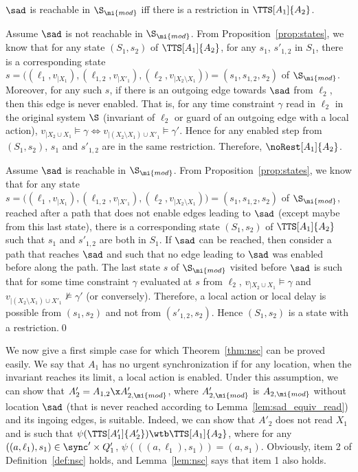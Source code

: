 \documentclass{LMCS}
\theoremstyle{plain}\newtheorem*{prop11}{Proposition~\ref{prop:states} bis}
\begin{document}
\begin{lem}\label{lem:sad_equiv_read}
  $\sad$ is reachable in $\S_\mi{mod}$ iff there is a restriction
  in $\TTS[A_1]{A_2}$.
\end{lem}
\proof
  Assume $\sad$ is not reachable in $\S_\mi{mod}$. From
  Proposition~\ref{prop:states}, we know that for any state $(S_1,s_2)$ of
  $\TTS[A_1]{A_2}$, for any $s_1$, $s'_{1,2}$ in $S_1$, there is a
  corresponding state $s=\big((\ell_1,v_{|X_1}),(\ell_{1,2},v_{|X'_1}),
  (\ell_2,v_{|X_2\setminus X_1})\big)=(s_1,s_{1,2},s_2)$ of $\S_\mi{mod}$. Moreover, for
  any such $s$, if there is an outgoing edge towards $\sad$ from $\ell_2$,
  then this edge is never enabled. That is, for any time constraint $\gamma$
  read in $\ell_2$ in the original system $\S$ (invariant of $\ell_2$ or
  guard of an outgoing edge with a local action),
  $v_{|X_2\cup X_1}\models \gamma\iff
  v_{|(X_2\setminus X_1)\cup X'_1}\models \gamma'$.
  Hence for any enabled step from $(S_1,s_2)$, $s_1$ and $s'_{1,2}$ are in the
  same restriction. Therefore, $\noRest[A_1]{A_2}$.

  Assume $\sad$ is reachable in $\S_\mi{mod}$. From
  Proposition~\ref{prop:states}, we know that for any state
  $s=\big((\ell_1,v_{|X_1}),(\ell_{1,2},v_{|X'_1}),(\ell_2,v_{|X_2\setminus X_1})\big)
  =(s_1,s_{1,2},s_2)$ of $\S_\mi{mod}$, reached after a path that does not
  enable edges leading to $\sad$ (except maybe from this last state), there
  is a corresponding state $(S_1,s_2)$ of $\TTS[A_1]{A_2}$ such that
  $s_1$ and $s'_{1,2}$ are both in $S_1$.
If $\sad$ can be reached, then consider a path that reaches $\sad$
  and such that no edge leading to $\sad$ was enabled before along the path.
  The last state $s$ of $\S_\mi{mod}$ visited before $\sad$ is such that
  for some time constraint $\gamma$ evaluated at $s$ from $\ell_2$,
  $v_{|X_2\cup X_1}\models \gamma$ and
  $v_{|(X_2\setminus X_1)\cup X'_1}\not\models \gamma'$ (or conversely).
  Therefore, a local action or local delay is possible from $(s_1,s_2)$ and
  not from $(s'_{1,2},s_2)$.
  Hence $(S_1,s_2)$ is a state with a restriction.\qed




We now give a first simple case for which Theorem~\ref{thm:nsc} can be proved
easily. We say that $A_1$ has no urgent synchronization if for any location,
when the invariant reaches its limit, a local action is enabled.
Under this assumption, we can show that
$A'_2=A_{1,2}\x A'_{2,\mi{mod}}$, where $A'_{2,\mi{mod}}$ is
$A_{2,\mi{mod}}$ without location $\sad$ (that is never reached according to
Lemma~\ref{lem:sad_equiv_read}) and its ingoing edges, is suitable.
Indeed, we can show that $A'_2$ does not read $X_1$ and is such that
$\psi(\TTS[A'_1]{A'_2})\wtb\TTS[A_1]{A_2}$, where for any
$((a,\ell_1),s_1)\in \sync'\times Q'_1$, $\psi(((a,\ell_1),s_1))=(a,s_1)$.
Obviously, item 2 of Definition~\ref{def:nsc} holds, and Lemma~\ref{lem:nsc}
says that item 1 also holds.
\end{document}
